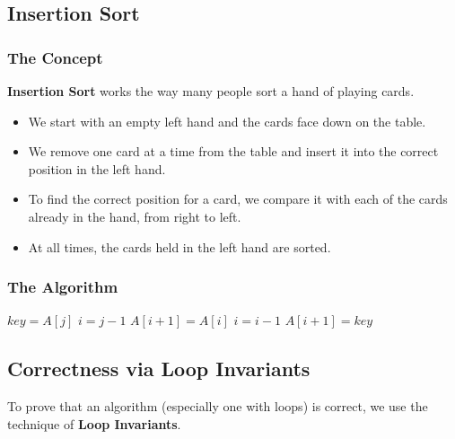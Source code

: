 \documentclass[12pt]{article}
\theoremstyle{blueplain}
\theoremstyle{bluedef}
\theoremstyle{blueremark}
\begin{document}
\subsection{Insertion Sort}

\subsubsection{The Concept}

\textbf{Insertion Sort} works the way many people sort a hand of playing cards.
\begin{itemize}
    \item We start with an empty left hand and the cards face down on the table.
    \item We remove one card at a time from the table and insert it into the correct position in the left hand.
    \item To find the correct position for a card, we compare it with each of the cards already in the hand, from right to left.
    \item At all times, the cards held in the left hand are sorted.
\end{itemize}

\subsubsection{The Algorithm}

\begin{algorithm}
    \caption{Insertion Sort}\label{alg:insertionSort}
    \begin{algorithmic}[1]
         
        \State $key = A[j]$
        \State {}
        \State $i = j - 1$
        \State $A[i+1] = A[i]$ 
        \State $i = i - 1$
        \EndWhile
        \State $A[i+1] = key$ 
        \EndFor
        \EndProcedure
    \end{algorithmic}
\end{algorithm}


\subsection{Correctness via Loop Invariants}

To prove that an algorithm (especially one with loops) is correct, we use the technique of \textbf{Loop Invariants}.
\end{document}

